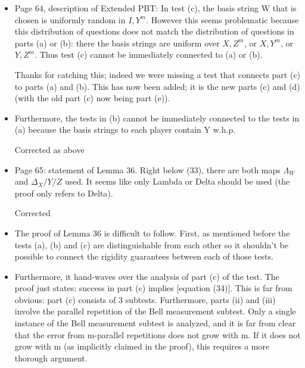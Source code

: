 \documentclass[12pt]{article}
\begin{document}
\begin{itemize}
\item Page 64, description of Extended PBT: In test (c), the basis string W that is chosen is uniformly random in ${I, Y}^m$. However this seems problematic because this distribution of questions does not match the distribution of questions in parts (a) or (b): there the basis strings are uniform over ${X,Z}^m$, or ${X,Y}^m$, or ${Y,Z}^m$. Thus test (c) cannot be immediately connected to (a) or (b).

{\color{blue} Thanks for catching this; indeed we were missing a test that connects part (c) to parts (a) and (b). This has now been added; it is the new parts (c) and (d) (with the old part (c) now being part (e)). }

\item Furthermore, the tests in (b) cannot be immediately connected to the tests in (a) because the basis strings to each player contain Y w.h.p.

{\color{blue} Corrected as above}

\item Page 65: statement of Lemma 36. Right below (33), there are both maps $\Lambda_W$ and $\Delta_X/Y/Z$ used. It seems like only Lambda or Delta should be used (the proof only refers to Delta).

{\color{blue} Corrected}


\item The proof of Lemma 36 is difficult to follow. First, as mentioned before the tests (a), (b) and (c) are distinguishable from each other so it shouldn't be possible to connect the rigidity guarantees between each of those tests.

\item Furthermore,  it hand-waves over the analysis of part (c) of the test. The proof just states: success in part (c) implies [equation (34)]. This is far from obvious: part (c) consists of 3 subtests. Furthermore, parts (ii) and (iii) involve the parallel repetition of the Bell measurement subtest. Only a single instance of the Bell measurement subtest is analyzed, and it is far from clear that the error from m-parallel repetitions does not grow with m.  If it does not grow with m (as implicitly claimed in the proof), this requires a more thorough argument.
\end{itemize}
\end{document}
